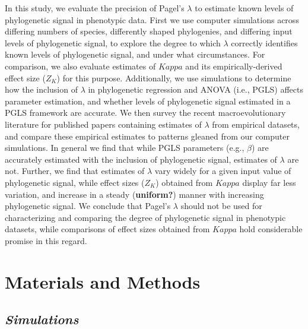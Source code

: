 \documentclass[
]{article}
\begin{document}
In this study, we evaluate the precision of Pagel's \(\lambda\) to
estimate known levels of phylogenetic signal in phenotypic data. First
we use computer simulations across differing numbers of species,
differently shaped phylogenies, and differing input levels of
phylogenetic signal, to explore the degree to which \(\lambda\)
correctly identifies known levels of phylogenetic signal, and under what
circumstances. For comparison, we also evaluate estimates of \(Kappa\)
and its empirically-derived effect size (\(Z_K\)) for this purpose.
Additionally, we use simulations to determine how the inclusion of
\(\lambda\) in phylogenetic regression and ANOVA (i.e., PGLS) affects
parameter estimation, and whether levels of phylogenetic signal
estimated in a PGLS framework are accurate. We then survey the recent
macroevolutionary literature for published papers containing estimates
of \(\lambda\) from empirical datasets, and compare these empirical
estimates to patterns gleaned from our computer simulations. In general
we find that while PGLS parameters (e.g., \(\beta\)) are accurately
estimated with the inclusion of phylogenetic signal, estimates of
\(\lambda\) are not. Further, we find that estimates of \(\lambda\) vary
widely for a given input value of phylogenetic signal, while effect
sizes (\(Z_K\)) obtained from \(Kappa\) display far less variation, and
increase in a steady (\textbf{uniform?}) manner with increasing
phylogenetic signal. We conclude that Pagel's \(\lambda\) should not be
used for characterizing and comparing the degree of phylogenetic signal
in phenotypic datasets, while comparisons of effect sizes obtained from
\(Kappa\) hold considerable promise in this regard.

\hypertarget{materials-and-methods}{%
\section{Materials and Methods}\label{materials-and-methods}}

\hypertarget{simulations}{%
\subsection{\texorpdfstring{\emph{Simulations}}{Simulations}}\label{simulations}}
\end{document}
